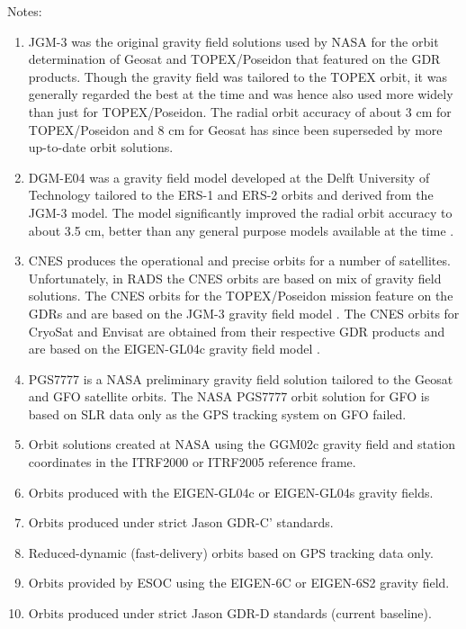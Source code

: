 \documentclass[a4paper,11pt,openany,natbib]{thesis}
\begin{document}
Notes:
\begin{enumerate}
\item JGM-3 \citep{tapley1996} was the original gravity field solutions used by NASA for the orbit determination of Geosat and TOPEX/Poseidon that featured on the GDR products. Though the gravity field was tailored to the TOPEX orbit, it was generally regarded the best at the time and was hence also used more widely than just for TOPEX/Poseidon. The radial orbit accuracy of about 3 cm for TOPEX/Poseidon and 8 cm for Geosat has since been superseded by more up-to-date orbit solutions.\label{item:alt_jgm3}
\item DGM-E04 was a gravity field model developed at the Delft University of Technology tailored to the ERS-1 and ERS-2 orbits and derived from the JGM-3 model. The model significantly improved the radial orbit accuracy to about 3.5 cm, better than any general purpose models available at the time \citep{scharroo1998a}.\label{item:alt_dgme04}
\item CNES produces the operational and precise orbits for a number of satellites. Unfortunately, in RADS the CNES orbits are based on mix of gravity field solutions. The CNES orbits for the TOPEX/Poseidon mission feature on the GDRs and are based on the JGM-3 gravity field model \citep{tapley1996}. The CNES orbits for CryoSat and Envisat are obtained from their respective GDR products and are based on the EIGEN-GL04c gravity field model \citep{ablain2008}.\label{item:alt_cnes}
\item PGS7777 is a NASA preliminary gravity field solution tailored to the Geosat and GFO satellite orbits. The NASA PGS7777 orbit solution for GFO \citep{lemoine2006a} is based on SLR data only as the GPS tracking system on GFO failed.\label{item:alt_pgs7777}
\item Orbit solutions created at NASA using the GGM02c gravity field and station coordinates in the ITRF2000 or ITRF2005 reference frame.\label{item:alt_ggm02c}
\item Orbits produced with the EIGEN-GL04c or EIGEN-GL04s gravity fields.\label{item:alt_eiggl04s}
\item Orbits produced under strict Jason GDR-C' standards.\label{item:alt_gdrcp}
\item Reduced-dynamic (fast-delivery) orbits based on GPS tracking data only.\label{item:alt_gps}
\item Orbits provided by ESOC using the EIGEN-6C or EIGEN-6S2 gravity field.\label{item:alt_eig6}
\item Orbits produced under strict Jason GDR-D standards (current baseline).\label{item:alt_gdrd}

\end{enumerate}
\end{document}
